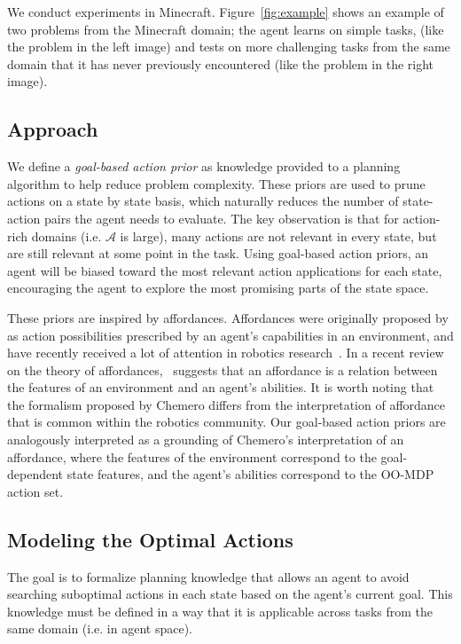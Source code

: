 \documentclass[11pt]{article}
\begin{document}
We conduct experiments in Minecraft. Figure~\ref{fig:example}
shows an example of two problems from the Minecraft domain; the agent learns on simple tasks,
(like the problem in the left image) and tests
on more challenging tasks from the same domain that it has never previously
encountered (like the problem in the right image).

\subsection{Approach}
We define a {\it goal-based action prior} as knowledge provided to a planning algorithm to help reduce problem complexity. These priors are used to prune actions on a state by state basis, which naturally reduces the number of state-action pairs the agent needs to evaluate. The key observation is that for action-rich domains (i.e. $\mathcal{A}$ is large), many actions are not relevant in every state, but are still relevant at some point in the task. Using goal-based action priors, an agent will be biased toward the most relevant action applications for each state, encouraging the agent to explore the most promising parts of the state space.

These priors are inspired by affordances.
Affordances were originally proposed by \cite{gibson77} as action possibilities
prescribed by an agent's capabilities in an environment, and have recently
received a lot of attention in robotics research~\cite{koppula13a,koppula13c}. In a recent review on the theory of affordances,~\cite{chemero2003}
suggests that an affordance is a relation between the features of an
environment and an agent's abilities. It is worth noting that the formalism
proposed by Chemero differs from the interpretation of affordance that is
common within the robotics community. Our goal-based action priors are
analogously interpreted as a grounding of Chemero's interpretation of an affordance,
where the features of the environment correspond to
the goal-dependent state features, and the agent's abilities
correspond to the OO-MDP action set.

\subsection{Modeling the Optimal Actions}

The goal is to formalize planning knowledge that allows an agent to
avoid searching suboptimal actions in each state based on the agent's
current goal. This knowledge must be defined in a way that it is applicable across tasks from the same domain (i.e. in agent space).
\end{document}
